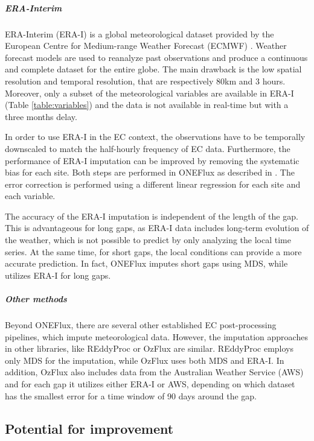 \documentclass{article}
\let\Oldsubsection\subsection
\renewcommand{\subsection}{\FloatBarrier\Oldsubsection}
\begin{document}
\subparagraph{ERA-Interim} ERA-Interim (ERA-I) is a global meteorological dataset provided by the European Centre for Medium-range Weather Forecast (ECMWF) \cite{dee_era-interim_2011}. Weather forecast models are used to reanalyze past observations and produce a continuous and complete dataset for the entire globe. The main drawback is the low spatial resolution and temporal resolution, that are respectively 80km and 3 hours. Moreover, only a subset of the meteorological variables are available in ERA-I (Table \ref{table:variables}) and the data is not available in real-time but with a three months delay.

In order to use ERA-I in the EC context, the observations have to be temporally downscaled to match the half-hourly frequency of EC data. Furthermore, the performance of ERA-I imputation can be improved by removing the systematic bias for each site. Both steps are performed in \textsf{ONEFlux} as described in \textcite{vuichard_filling_2015}. The error correction is performed using a different linear regression for each site and each variable.

The accuracy of the ERA-I imputation is independent of the length of the gap. This is advantageous for long gaps, as ERA-I data includes long-term evolution of the weather, which is not possible to predict by only analyzing the local time series. At the same time, for short gaps, the local conditions can provide a more  accurate prediction.
In fact, \textsf{ONEFlux} imputes short gaps using MDS, while utilizes ERA-I for long gaps.

\subparagraph{Other methods} Beyond \textsf{ONEFlux}, there are several other established EC post-processing pipelines, which impute meteorological data. However, the imputation approaches in other libraries, like \textsf{REddyProc} \cite{wutzler_basic_2018} or \textsf{OzFlux} \cite{isaac_ozflux_2017} are similar. \textsf{REddyProc} employs only MDS for the imputation, while \textsf{OzFlux} uses both MDS and ERA-I. In addition, \textsf{OzFlux} also includes data from the Australian Weather Service (AWS) and for each gap it utilizes either ERA-I or AWS, depending on which dataset has the smallest error for a time window of 90 days around the gap.

\subsection{Potential for improvement}
\end{document}
